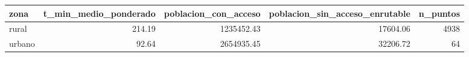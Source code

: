\begin{tabular}{lrrrr}
\toprule
zona & t_min_medio_ponderado & poblacion_con_acceso & poblacion_sin_acceso_enrutable & n_puntos \\
\midrule
rural & 214.19 & 1235452.43 & 17604.06 & 4938 \\
urbano & 92.64 & 2654935.45 & 32206.72 & 64 \\
\bottomrule
\end{tabular}

